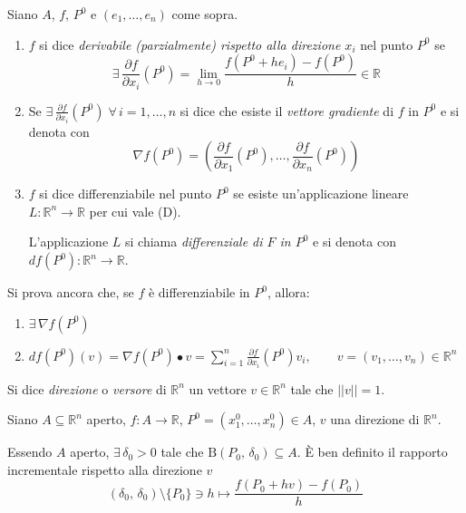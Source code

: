 \begin{definition}
Siano $A$, $f$, $P^0$ e $(e_1,\ldots,e_n)$ come sopra.
\begin{enumerate}[labelindent=\parindent,leftmargin=*,label=\textnormal{(\roman*)},start=1]
\item $f$ si dice \emph{derivabile (parzialmente) rispetto alla direzione $x_i$} nel punto $P^0$ se
$$
\exists \, \frac{\partial f}{\partial x_i} (P^0) = \lim_{h \rightarrow 0} \frac{f(P^0+he_i)-f(P^0)}{h} \in \mathbb{R}
$$

\item Se $\displaystyle \exists \, \frac{\partial f}{\partial x_i} (P^0) \; \forall \, i=1,\ldots,n$ si dice che esiste il \emph{vettore gradiente} di $f$ in $P^0$ e si denota con
$$
\nabla f(P^0) = \left( \frac{\partial f}{\partial x_1}(P^0),\ldots,\frac{\partial f}{\partial x_n}(P^0) \right)
$$

\item $f$ si dice differenziabile nel punto $P^0$ se esiste un'applicazione lineare $L:\mathbb{R}^n \rightarrow \mathbb{R}$ per cui vale (D).

L'applicazione $L$ si chiama \emph{differenziale di $F$ in $P^0$} e si denota con $df(P^0):\mathbb{R}^n \rightarrow \mathbb{R}$.
\end{enumerate}
\end{definition}

Si prova ancora che, se $f$ è differenziabile in $P^0$, allora:
\begin{enumerate}[labelindent=\parindent,leftmargin=*,label=\textnormal{(\roman*)},start=1]
\item $\exists \, \nabla f(P^0)$
\item $\displaystyle df(P^0)(v) = \nabla f(P^0) \bullet v = \sum_{i=1}^n \frac{\partial f}{\partial x_i} (P^0)v_i, \qquad v=(v_1,\ldots,v_n) \in \mathbb{R}^n$
\end{enumerate}

\begin{definition}
Si dice \emph{direzione} o \emph{versore} di $\mathbb{R}^n$ un vettore $v \in \mathbb{R}^n$ tale che $||v|| = 1$.
\end{definition}

Siano $A \subseteq \mathbb{R}^n$ aperto, $f: A \longrightarrow \mathbb{R}$, $P^0 = (x_1^0,\ldots,x_n^0) \in A$, $v$ una direzione di $\mathbb{R}^n$.

Essendo $A$ aperto, $\exists \, \delta_0 > 0$ tale che $\mathrm{B}(P_0,\,\delta_0) \subseteq A$. \`E ben definito il rapporto incrementale rispetto alla direzione $v$
$$
(\delta_0,\,\delta_0) \setminus \lbrace P_0 \rbrace \ni h \longmapsto
\frac{f(P_0+hv)-f(P_0)}{h}
$$

